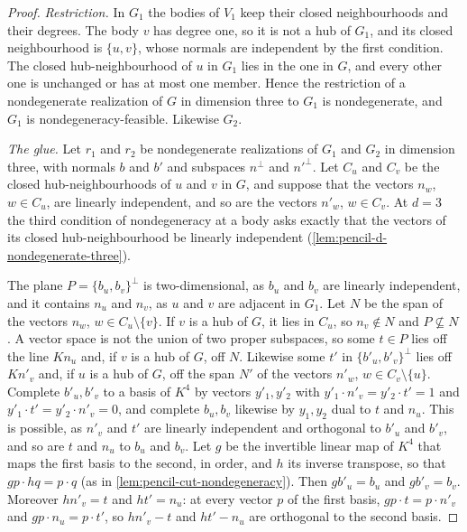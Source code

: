 \begin{proof}
  \leanok
  \emph{Restriction.} In $G_1$ the bodies of $V_1$ keep their closed
  neighbourhoods and their degrees. The body $v$ has degree one, so it is
  not a hub of $G_1$, and its closed neighbourhood is $\{u, v\}$, whose
  normals are independent by the first condition. The closed
  hub-neighbourhood of $u$ in $G_1$ lies in the one in $G$, and every
  other one is unchanged or has at most one member. Hence the
  restriction of a nondegenerate realization of $G$ in dimension three to
  $G_1$ is nondegenerate, and $G_1$ is nondegeneracy-feasible. Likewise
  $G_2$.

  \emph{The glue.} Let $r_1$ and $r_2$ be nondegenerate realizations of
  $G_1$ and $G_2$ in dimension three, with normals $b$ and $b'$ and
  subspaces $n^{\perp}$ and $n'^{\perp}$. Let $C_u$ and $C_v$ be the
  closed hub-neighbourhoods of $u$ and $v$ in $G$, and suppose that the
  vectors $n_w$, $w \in C_u$, are linearly independent, and so are the
  vectors $n'_w$, $w \in C_v$. At $d = 3$ the third condition of
  nondegeneracy at a body asks exactly that the vectors of its closed
  hub-neighbourhood be linearly independent
  (\cref{lem:pencil-d-nondegenerate-three}).

  The plane $P = \{b_u, b_v\}^{\perp}$ is two-dimensional, as $b_u$ and
  $b_v$ are linearly independent, and it contains $n_u$ and $n_v$, as $u$
  and $v$ are adjacent in $G_1$. Let $N$ be the span of the vectors
  $n_w$, $w \in C_u \setminus \{v\}$. If $v$ is a hub of $G$, it lies in
  $C_u$, so $n_v \notin N$ and $P \not\subseteq N$. A vector space is not
  the union of two proper subspaces, so some $t \in P$ lies off the line
  $K n_u$ and, if $v$ is a hub of $G$, off $N$. Likewise some $t'$ in
  $\{b'_u, b'_v\}^{\perp}$ lies off $K n'_v$ and, if $u$ is a hub of $G$,
  off the span $N'$ of the vectors $n'_w$, $w \in C_v \setminus \{u\}$.
  Complete $b'_u, b'_v$ to a basis of $K^4$ by vectors $y'_1, y'_2$ with
  $y'_1 \cdot n'_v = y'_2 \cdot t' = 1$ and
  $y'_1 \cdot t' = y'_2 \cdot n'_v = 0$, and complete $b_u, b_v$ likewise
  by $y_1, y_2$ dual to $t$ and $n_u$. This is possible, as $n'_v$ and
  $t'$ are linearly independent and orthogonal to $b'_u$ and $b'_v$, and
  so are $t$ and $n_u$ to $b_u$ and $b_v$. Let $g$ be the invertible
  linear map of $K^4$ that maps the first basis to the second, in order,
  and $h$ its inverse transpose, so that $g p \cdot h q = p \cdot q$ (as
  in \cref{lem:pencil-cut-nondegeneracy}). Then $g b'_u = b_u$ and
  $g b'_v = b_v$. Moreover $h n'_v = t$ and $h t' = n_u$: at every vector
  $p$ of the first basis, $g p \cdot t = p \cdot n'_v$ and
  $g p \cdot n_u = p \cdot t'$, so $h n'_v - t$ and $h t' - n_u$ are
  orthogonal to the second basis.


\end{proof}
